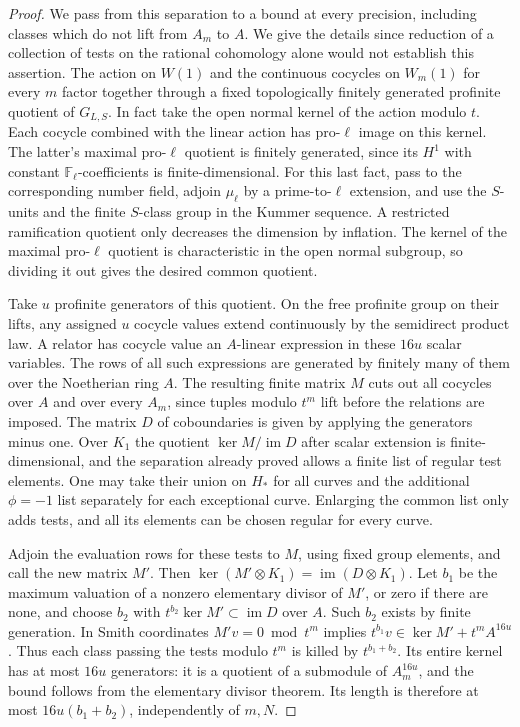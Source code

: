 \documentclass[a4paper,11pt]{article}
\theoremstyle{definition}
\theoremstyle{remark}
\numberwithin{equation}{section}
\begin{document}
\begin{proof}
We pass from this separation to a bound at every
precision, including classes which do not lift from
\(A_m\) to \(A\). We give the details since reduction
of a collection of tests on the rational cohomology
alone would not establish this assertion. The action
on \(W(1)\) and the continuous cocycles on \(W_m(1)\)
for every \(m\) factor together through a fixed
topologically finitely generated profinite quotient
of \(G_{L,S}\). In fact take the open normal kernel
of the action modulo \(t\). Each cocycle combined with
the linear action has pro-\(\ell\) image on this kernel.
The latter's maximal pro-\(\ell\) quotient is finitely
generated, since its \(H^1\) with constant
\(\mathbb F_\ell\)-coefficients is finite-dimensional.
For this last fact, pass to the corresponding number
field, adjoin \(\mu_\ell\) by a prime-to-\(\ell\)
extension, and use the \(S\)-units and the finite
\(S\)-class group in the Kummer sequence. A restricted
ramification quotient only decreases the dimension by
inflation. The kernel of the maximal pro-\(\ell\)
quotient is characteristic in the open normal subgroup,
so dividing it out gives the desired common quotient.

Take \(u\) profinite generators of this quotient. On the free
profinite group on their lifts, any assigned \(u\) cocycle
values extend continuously by the semidirect product law.
A relator has cocycle value an \(A\)-linear expression in
these \(16u\) scalar variables. The rows of all such
expressions are generated by finitely many of them over
the Noetherian ring \(A\). The resulting finite matrix
\(M\) cuts out all cocycles over \(A\) and over every
\(A_m\), since tuples modulo \(t^m\) lift before the
relations are imposed. The matrix \(D\) of coboundaries
is given by applying the generators minus one. Over
\(K_1\) the quotient \(\ker M/\operatorname{im} D\)
after scalar extension is finite-dimensional, and the
separation already proved allows a finite list of regular
test elements. One may take their union on \(H_*\) for
all curves and the additional \(\phi=-1\) list separately
for each exceptional curve. Enlarging the common list
only adds tests, and all its elements can be chosen
regular for every curve.

Adjoin the evaluation rows for these tests to \(M\), using
fixed group elements, and call the new matrix \(M'\).
Then \(\ker(M'\otimes K_1)=\operatorname{im}(D\otimes K_1)\).
Let \(b_1\) be the maximum valuation of a nonzero elementary
divisor of \(M'\), or zero if there are none, and choose
\(b_2\) with \(t^{b_2}\ker M'\subset\operatorname{im}D\)
over \(A\). Such \(b_2\) exists by finite generation.
In Smith coordinates \(M'v=0\bmod t^m\) implies
\(t^{b_1}v\in\ker M'+t^m A^{16u}\). Thus each class
passing the tests modulo \(t^m\) is killed by
\(t^{b_1+b_2}\). Its entire kernel has at most \(16u\)
generators: it is a quotient of a submodule of
\(A_m^{16u}\), and the bound follows from the elementary
divisor theorem. Its length is therefore at most
\(16u(b_1+b_2)\), independently of \(m,N\).


\end{proof}
\end{document}
